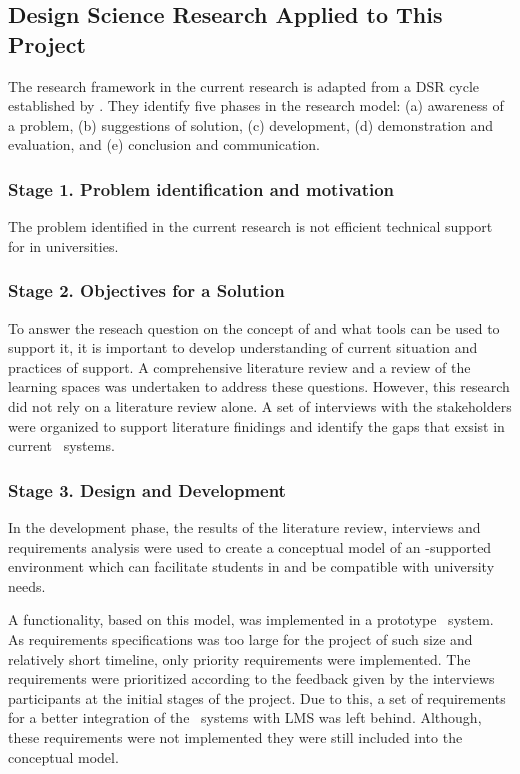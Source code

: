 \subsection{Design Science Research Applied to This Project}

The research framework in the current research is adapted from a DSR cycle
established by \citet{Vaishnavi2007}. They identify five phases in the research
model: (a) awareness of a problem, (b) suggestions of solution, (c) development,
(d) demonstration and evaluation, and (e) conclusion and communication.

\subsubsection{Stage 1. Problem identification and motivation}

The problem identified in the current research is not efficient technical
support for \LLLs in universities.

\subsubsection{Stage 2. Objectives for a Solution}

To answer the reseach question on the concept of \LLLs and what tools can be
used to support it, it is important to develop understanding of current
situation and practices of \LLLs support. A comprehensive literature review
and a review of the learning spaces was undertaken to address these questions.
However, this research did not rely on a literature review alone. A set of
interviews with the stakeholders were organized to support literature finidings
and identify the gaps that exsist in current \ep~systems.

\subsubsection{Stage 3. Design and Development}

In the development phase, the results of the literature review, interviews and
requirements analysis were used to create a conceptual model of an \ep-supported
environment which can facilitate students in \LLLs and be compatible with
university needs.

A functionality, based on this model, was implemented in a prototype \ep~system.
As requirements specifications was too large for the project of such size and
relatively short timeline, only priority requirements were implemented. The
requirements were prioritized according to the feedback given by the interviews
participants at the initial stages of the project. Due to this, a set of
requirements for a better integration of the \ep~systems with LMS was left
behind. Although, these requirements were not implemented they were still
included into the conceptual model.

